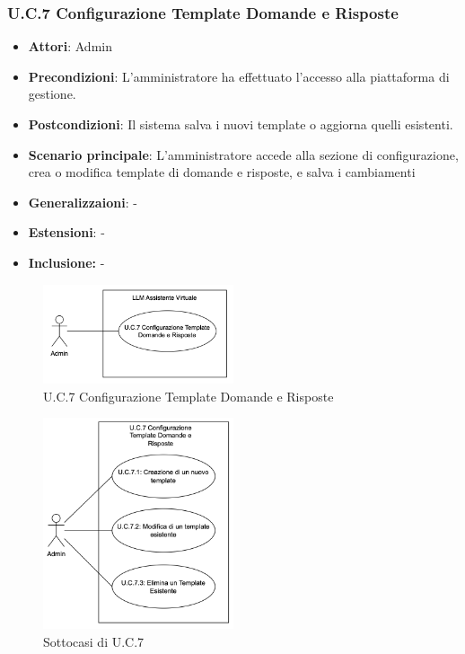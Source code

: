 \subsubsection{U.C.7 Configurazione Template Domande e Risposte}
\begin{itemize}
    \item \textbf{Attori}: Admin
    \item \textbf{Precondizioni}: L’amministratore ha effettuato l’accesso alla piattaforma di gestione.
    \item \textbf{Postcondizioni}: Il sistema salva i nuovi template o aggiorna quelli esistenti.
    \item \textbf{Scenario principale}: L’amministratore accede alla sezione di configurazione, crea o modifica template di domande e risposte, e salva i cambiamenti
    \item \textbf{Generalizzaioni}: -
    \item \textbf{Estensioni}: -
    \item \textbf{Inclusione:} -
\end{itemize}
\begin{figure}[h!]
    \centering
    \includegraphics[width=0.5\textwidth]{img/UC7.png}
    \caption{U.C.7 Configurazione Template Domande e Risposte}
\end{figure}
\begin{figure}[h!]
    \centering
    \includegraphics[width=0.5\textwidth]{img/UC7p1.png}
    \caption{Sottocasi di U.C.7}
\end{figure}
\newpage
